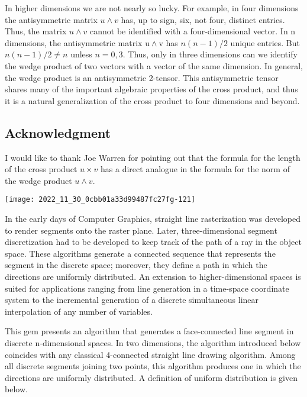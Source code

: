 \begin{CJK}{UTF8}{gbsn}
In higher dimensions we are not nearly so lucky. For example, in four dimensions the antisymmetric matrix $u \wedge v$ has, up to sign, six, not four, distinct entries. Thus, the matrix $u \wedge v$ cannot be identified with a four-dimensional vector. In $\mathrm{n}$ dimensions, the antisymmetric matrix $\mathrm{u} \wedge \mathrm{v}$ has $n(n-1) / 2$ unique entries. But $n(n-1) / 2 \neq n$ unless $n=0,3$. Thus, only in three dimensions can we identify the wedge product of two vectors with a vector of the same dimension. In general, the wedge product is an antisymmetric 2-tensor. This antisymmetric tensor shares many of the important algebraic properties of the cross product, and thus it is a natural generalization of the cross product to four dimensions and beyond.

\subsection*{Acknowledgment}
I would like to thank Joe Warren for pointing out that the formula for the length of the cross product $u \times v$ has a direct analogue in the formula for the norm of the wedge product $u \wedge v$.

\newpage
\begin{center}
\texttt{[image: 2022\_11\_30\_0cbb01a33d99487fc27fg-121]}
\end{center}

In the early days of Computer Graphics, straight line rasterization was developed to render segments onto the raster plane. Later, three-dimensional segment discretization had to be developed to keep track of the path of a ray in the object space. These algorithms generate a connected sequence that represents the segment in the discrete space; moreover, they define a path in which the directions are uniformly distributed. An extension to higher-dimensional spaces is suited for applications ranging from line generation in a time-space coordinate system to the incremental generation of a discrete simultaneous linear interpolation of any number of variables.

This gem presents an algorithm that generates a face-connected line segment in discrete n-dimensional spaces. In two dimensions, the algorithm introduced below coincides with any classical 4-connected straight line drawing algorithm. Among all discrete segments joining two points, this algorithm produces one in which the directions are uniformly distributed. A definition of uniform distribution is given below.


\end{CJK}
